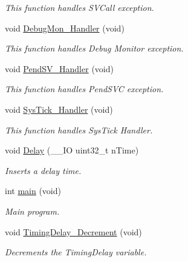 \begin{DoxyCompactItemize}
\begin{DoxyCompactList}\small\item\em This function handles S\-V\-Call exception. \end{DoxyCompactList}\item 
void \hyperlink{group___sys_tick___example_gadbdfb05858cc36fc520974df37ec3cb0}{Debug\-Mon\-\_\-\-Handler} (void)
\begin{DoxyCompactList}\small\item\em This function handles Debug Monitor exception. \end{DoxyCompactList}\item 
void \hyperlink{group___sys_tick___example_ga6303e1f258cbdc1f970ce579cc015623}{Pend\-S\-V\-\_\-\-Handler} (void)
\begin{DoxyCompactList}\small\item\em This function handles Pend\-S\-V\-C exception. \end{DoxyCompactList}\item 
void \hyperlink{group___sys_tick___example_gab5e09814056d617c521549e542639b7e}{Sys\-Tick\-\_\-\-Handler} (void)
\begin{DoxyCompactList}\small\item\em This function handles Sys\-Tick Handler. \end{DoxyCompactList}\item 
void \hyperlink{group___sys_tick___example_gadf6ebc82af142bc201d3eb70e107f52e}{Delay} (\-\_\-\-\_\-\-I\-O uint32\-\_\-t n\-Time)
\begin{DoxyCompactList}\small\item\em Inserts a delay time. \end{DoxyCompactList}\item 
int \hyperlink{group___sys_tick___example_ga840291bc02cba5474a4cb46a9b9566fe}{main} (void)
\begin{DoxyCompactList}\small\item\em Main program. \end{DoxyCompactList}\item 
void \hyperlink{group___sys_tick___example_gaeb4c4307d28035637f0280cce42553fe}{Timing\-Delay\-\_\-\-Decrement} (void)
\begin{DoxyCompactList}\small\item\em Decrements the Timing\-Delay variable. \end{DoxyCompactList}\end{DoxyCompactItemize}
